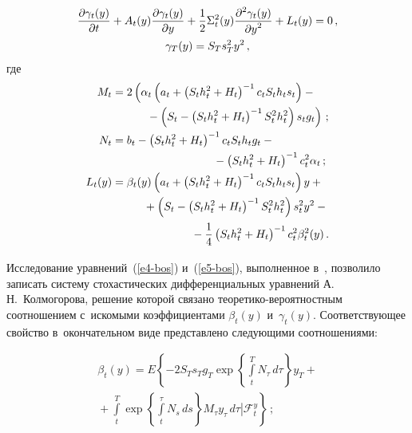 \begin{multicols}{2}
     \vspace*{-12pt}
     
     \noindent
     \begin{multline}
\displaystyle\frac{\displaystyle \partial\gamma_t(y)\mathstrut}{\displaystyle \partial t\mathstrut}+A_t(y) \displaystyle\frac{\displaystyle \partial\gamma_t(y)\mathstrut}{\displaystyle \partial 
y\mathstrut}+\displaystyle\frac{\displaystyle 1\mathstrut}{\displaystyle 2\mathstrut}\Sigma_t^2(y)
\displaystyle\frac{\displaystyle \partial^2\gamma_t(y)\mathstrut}{\displaystyle \partial y^2\mathstrut} +L_t(y)=0\,,\\
\gamma_T(y)= S_T s_T^2 y^2\,,
\label{e7-bos}
\end{multline}
где
\begin{align*}
M_t&= 2\left( \alpha_t\left(a_t+\left( S_t h_t^2+H_t\right)^{-1} c_t S_t h_t 
s_t\right) - {}\right.\\
&\left.\hspace*{10mm}{}-\left( S_t -\left( S_t h_t^2+H_t\right)^{-1} S_t^2 h_t^2\right) s_t 
g_t\right)\,;\\
N_t&= b_t-\left( S_t h_t^2 +H_t\right)^{-1} c_t S_t h_t g_t -{}\\
&\hspace*{32mm}{}-\left( S_t h_t^2 +H_t\right)^{-1} c_t^2 \alpha_t\,;
\\
L_t(y) &=
\beta_t(y)\left( a_t+\left( S_th_t^2 +H_t\right)^{-1} c_t S_t h_t s_t\right) y+ {}\\
&\hspace*{10mm}{}+\left( S_t-\left( S_t h_t^2+H_t\right)^{-1} S_t^2 h_t^2\right) s_t^2 y^2 -{}\\
&\hspace*{25mm}{}-
\fr{1}{4}\left( S_t h_t^2 +H_t\right)^{-1} c_t^2 \beta_t^2(y)\,.
\end{align*}
     
     Исследование уравнений~(\ref{e4-bos}) и~(\ref{e5-bos}), выполненное 
в~\cite{3-bos}, позволило записать систему стохастических 
дифференциальных уравнений А.\,Н.~Колмогорова, решение которой 
связано тео\-ре\-ти\-ко-ве\-ро\-ят\-ност\-ным соотношением с~искомыми 
коэффициентами $\beta_t(y)$ и~$\gamma_t(y)$. Соответствующее свойство 
в~окончательном виде представлено следующими соотношениями:

\noindent
     \begin{multline}
\beta_t(y) =\displaystyle
     E\left\{ -2S_T s_T g_T \exp\left\{ \int\limits_t^T N_\tau\,d\tau\right\} 
y_T+{}\right.\\
\displaystyle \left.{}+\int\limits_t^T \exp
     \left\{ \int\limits_t^\tau N_s\,ds\right\} M_\tau y_\tau\,d\tau
     \left\vert \mathcal{F}_t^y\right.\right\}\,;
          \label{e8-bos}
     \end{multline}
     

\end{multicols}
